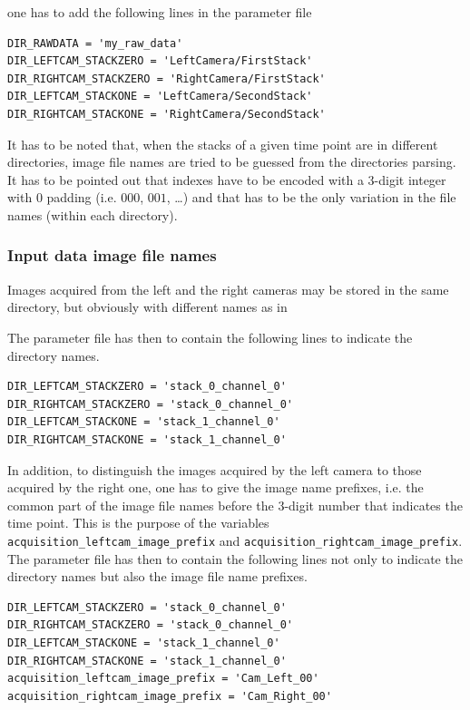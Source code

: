 one has to add the following lines in the parameter file
\begin{verbatim}
DIR_RAWDATA = 'my_raw_data'
DIR_LEFTCAM_STACKZERO = 'LeftCamera/FirstStack'
DIR_RIGHTCAM_STACKZERO = 'RightCamera/FirstStack'
DIR_LEFTCAM_STACKONE = 'LeftCamera/SecondStack'
DIR_RIGHTCAM_STACKONE = 'RightCamera/SecondStack'
\end{verbatim}

It has to be noted that, when the stacks of a given time point are in
different directories, image file names are tried to be guessed from
the directories parsing. It has to be pointed out that indexes have to
be encoded with a 3-digit integer with 0 padding (i.e. $000$, $001$,
\ldots) and that has to be the only variation in the file names
(within each directory).

\subsubsection{Input data image file names}

Images acquired from the left and the right cameras may be stored in
the same directory, but obviously with different names as in 

\mbox{}
\mbox{}

The parameter file has then to contain the following lines to indicate
the directory names.
\begin{verbatim}
DIR_LEFTCAM_STACKZERO = 'stack_0_channel_0'
DIR_RIGHTCAM_STACKZERO = 'stack_0_channel_0'
DIR_LEFTCAM_STACKONE = 'stack_1_channel_0'
DIR_RIGHTCAM_STACKONE = 'stack_1_channel_0'
\end{verbatim}

In addition, to distinguish the images acquired by the left camera to
those acquired by the right one, one has to give the image name
prefixes, i.e. the common part of the image file names before the
3-digit number that indicates the time point.
This is the purpose of the  variables
\verb|acquisition_leftcam_image_prefix| and 
\verb|acquisition_rightcam_image_prefix|.
The parameter file has then to contain the following lines not only to indicate
the directory names but also the image file name prefixes.

\begin{verbatim}
DIR_LEFTCAM_STACKZERO = 'stack_0_channel_0'
DIR_RIGHTCAM_STACKZERO = 'stack_0_channel_0'
DIR_LEFTCAM_STACKONE = 'stack_1_channel_0'
DIR_RIGHTCAM_STACKONE = 'stack_1_channel_0'
acquisition_leftcam_image_prefix = 'Cam_Left_00'
acquisition_rightcam_image_prefix = 'Cam_Right_00'
\end{verbatim}

